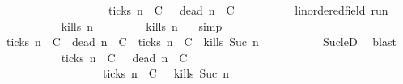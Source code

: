\begin{isabellebody}
\ \ \ \ \ \ \ \ \ \ \ \ \ \ \ \ \ {\isasymunion}\ {\isacharparenleft}{\isacharbraceleft}{\isasymrho}{\isachardot}\ {\isacharquery}ticks\ n\ {\isasymrho}\ C\ {\isasyminter}\ {\isacharbraceleft}{\isasymrho}{\isachardot}\ {\isacharquery}dead\ n\ {\isasymrho}\ C\isanewline
\ \ \isamarkupfalse%
\isanewline
\ \ \ \ \isacommand{{\isacharbraceleft}}\isamarkupfalse%
\ \isamarkupfalse%
\ {\isasymrho}{\isacharcolon}{\isacharcolon}{\isacartoucheopen}{\isacharprime}{\isasymtau}{\isacharcolon}{\isacharcolon}linordered{\isacharunderscore}field\ run{\isacartoucheclose}\isanewline
\ \ \ \ \ \ \isamarkupfalse%
\ {\isacartoucheopen}{\isasymrho}\ {\isasymin}\ {\isacharbraceleft}{\isasymrho}{\isachardot}\ {\isacharquery}kills\ n\ {\isasymrho}{\isacharbraceright}{\isacartoucheclose}\isanewline
\ \ \ \ \ \ \isamarkupfalse%
\ {\isacartoucheopen}{\isacharquery}kills\ n\ {\isasymrho}{\isacartoucheclose}\ \isamarkupfalse%
\ simp\isanewline
\ \ \ \ \ \ \isamarkupfalse%
\ {\isacartoucheopen}{\isacharparenleft}{\isacharquery}ticks\ n\ {\isasymrho}\ C\ {\isasymand}\ {\isacharquery}dead\ n\ {\isasymrho}\ C\ {\isasymor}\ {\isacharparenleft}{\isasymnot}{\isacharquery}ticks\ n\ {\isasymrho}\ C\ {\isasymand}\ {\isacharquery}kills\ {\isacharparenleft}Suc\ n{\isacharparenright}\ {\isasymrho}{\isacharparenright}{\isacartoucheclose}\isanewline
\ \ \ \ \ \ \ \ \isamarkupfalse%
\ Suc{\isacharunderscore}leD\ \isamarkupfalse%
\ blast\isanewline
\ \ \ \ \ \ \isamarkupfalse%
\ {\isacartoucheopen}{\isasymrho}\ {\isasymin}\ {\isacharparenleft}{\isacharbraceleft}{\isasymrho}{\isachardot}\ {\isacharquery}ticks\ n\ {\isasymrho}\ C\ {\isasyminter}\ {\isacharbraceleft}{\isasymrho}{\isachardot}\ {\isacharquery}dead\ n\ {\isasymrho}\ C\isanewline
\ \ \ \ \ \ \ \ \ \ \ \ \ \ \ {\isasymunion}\ {\isacharparenleft}{\isacharbraceleft}{\isasymrho}{\isachardot}\ {\isasymnot}\ {\isacharquery}ticks\ n\ {\isasymrho}\ C\ {\isasyminter}\ {\isacharbraceleft}{\isasymrho}{\isachardot}\ {\isacharquery}kills\ {\isacharparenleft}Suc\ n{\isacharparenright}\ {\isasymrho}{\isacharbraceright}{\isacharparenright}{\isacartoucheclose}\isanewline

\end{isabellebody}
